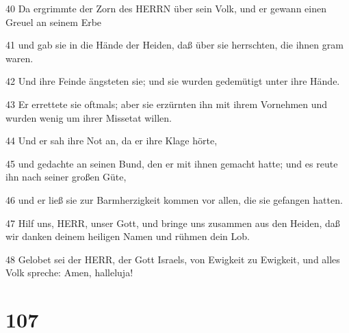 \par 40 Da ergrimmte der Zorn des HERRN über sein Volk, und er gewann einen Greuel an seinem Erbe
\par 41 und gab sie in die Hände der Heiden, daß über sie herrschten, die ihnen gram waren.
\par 42 Und ihre Feinde ängsteten sie; und sie wurden gedemütigt unter ihre Hände.
\par 43 Er errettete sie oftmals; aber sie erzürnten ihn mit ihrem Vornehmen und wurden wenig um ihrer Missetat willen.
\par 44 Und er sah ihre Not an, da er ihre Klage hörte,
\par 45 und gedachte an seinen Bund, den er mit ihnen gemacht hatte; und es reute ihn nach seiner großen Güte,
\par 46 und er ließ sie zur Barmherzigkeit kommen vor allen, die sie gefangen hatten.
\par 47 Hilf uns, HERR, unser Gott, und bringe uns zusammen aus den Heiden, daß wir danken deinem heiligen Namen und rühmen dein Lob.
\par 48 Gelobet sei der HERR, der Gott Israels, von Ewigkeit zu Ewigkeit, und alles Volk spreche: Amen, halleluja!

\chapter{107}

